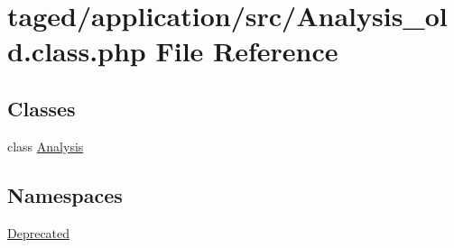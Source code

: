 \hypertarget{_analysis__old_8class_8php}{}\section{taged/application/src/\+Analysis\+\_\+old.class.\+php File Reference}
\label{_analysis__old_8class_8php}
\subsection*{Classes}
\begin{DoxyCompactItemize}
\item 
class \hyperlink{class_analysis}{Analysis}
\end{DoxyCompactItemize}
\subsection*{Namespaces}
\begin{DoxyCompactItemize}
\item 
 \hyperlink{namespace_deprecated}{Deprecated}
\end{DoxyCompactItemize}
